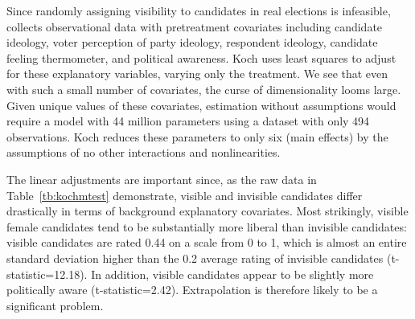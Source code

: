 \documentclass[11pt,titlepage]{article}
\begin{document}
Since randomly assigning visibility to candidates in real elections is
infeasible, \citet{Koch02} collects observational data with
pretreatment covariates including candidate ideology, voter perception
of party ideology, respondent ideology, candidate feeling thermometer,
and political awareness.  Koch uses least squares to adjust for these
explanatory variables, varying only the treatment.  We see that
even with such a small number of covariates, the curse of
dimensionality looms large.  Given unique values of these covariates,
estimation without assumptions would require a model with 44 million
parameters using a dataset with only 494 observations.  Koch reduces
these parameters to only six (main effects) by the assumptions of no
other interactions and nonlinearities.

The linear adjustments are important since, as the raw data in
Table~\ref{tb:kochmtest} demonstrate, visible and invisible candidates
differ drastically in terms of background explanatory covariates.
Most strikingly, visible female candidates tend to be substantially
more liberal than invisible candidates: visible candidates are rated
0.44 on a scale from 0 to 1, which is almost an entire standard
deviation higher than the 0.2 average rating of invisible candidates
(t-statistic=12.18).  In addition, visible candidates appear to be
slightly more politically aware (t-statistic=2.42).  Extrapolation is
therefore likely to be a significant problem.
\end{document}
